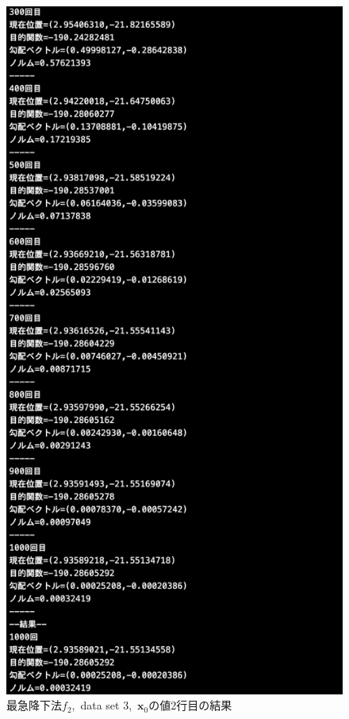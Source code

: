 \documentclass[12pt]{jarticle}
\begin{document}
\begin{figure}[h]
\begin{minipage}{0.5\hsize}
    \end{minipage}
    \begin{minipage}{0.5\hsize}
        \begin{center}
            \includegraphics[scale=0.2]{kadai1_2s_out3_2_3.png}
        \end{center}
    \end{minipage}
    \caption{最急降下法$f_2$,\ data set 3,\ $\boldsymbol{x}_0$の値2行目の結果}
\end{figure}
\end{document}
